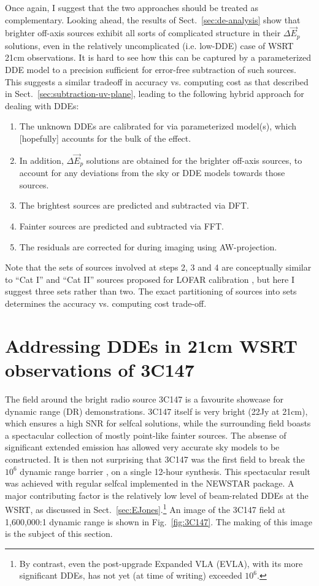 \documentclass[]{aa}
\newcommand{\jones}[2]{\vec {#1}_{#2}}
\begin{document}
Once again, I suggest that the two approaches should be treated as complementary. Looking ahead, the results of Sect.~\ref{sec:de-analysis} show that brighter off-axis sources exhibit all sorts of complicated structure in their $\Delta\jones{E}{p}$ solutions, even in the relatively uncomplicated (i.e. low-DDE) case of WSRT 21cm observations. It is hard to see how this can be captured by a parameterized DDE model to a precision sufficient for error-free subtraction of such sources. This suggests a similar tradeoff in accuracy vs. computing cost as that described in Sect.~\ref{sec:subtraction-uv-plane}, leading to the following hybrid approach for dealing with DDEs:

\begin{enumerate}
\item The unknown DDEs are calibrated for via parameterized model(s), which [hopefully] accounts for the bulk of the effect.
\item In addition, $\Delta\jones{E}{p}$ solutions are obtained for the brighter off-axis sources, to account for any deviations from the sky or DDE models towards those sources.
\item The brightest sources are predicted and subtracted via DFT. 
\item Fainter sources are predicted and subtracted via FFT.
\item The residuals are corrected for during imaging using AW-projection.
\end{enumerate}

Note that the sets of sources involved at steps 2, 3 and 4 are conceptually similar to ``Cat I'' and ``Cat II'' sources proposed for LOFAR calibration \citep{JEN:LOFAR3}, but here I suggest three sets rather than two. The exact partitioning of sources into sets determines the accuracy vs. computing cost trade-off.

\section{Addressing DDEs in 21cm WSRT observations of \label{sec:3C147}3C147}

The field around the bright radio source 3C147 is a favourite showcase for dynamic range (DR) demonstrations. 3C147 itself is very bright (22Jy at 21cm), which ensures a high SNR for selfcal solutions, while the surrounding field boasts a spectacular collection of mostly point-like fainter sources. The absense of significant extended emission has allowed very accurate sky models to be constructed. It is then not surprising that 3C147 was the first field to break the $10^6$ dynamic range barrier \citep{deBruyn:million,deBruyn:3C147}, on a single 12-hour synthesis. This spectacular result was achieved with regular selfcal implemented in the NEWSTAR package. A major contributing factor is the relatively low level of beam-related DDEs at the WSRT, as discussed in 
Sect.~\ref{sec:EJones}.\footnote{By contrast, even the post-upgrade Expanded VLA (EVLA), with its more significant DDEs, has not yet (at time of writing) exceeded $10^6$.} An image of the 3C147 field at 1,600,000:1 dynamic range is shown in Fig.~\ref{fig:3C147}. The making of this image is the subject of this section. 
\end{document}
